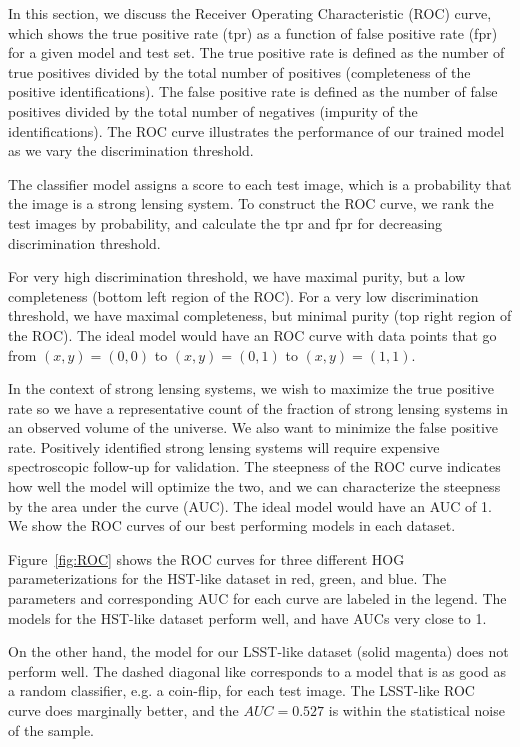 \documentclass{emulateapj}
\begin{document}
In this section, we discuss the Receiver Operating Characteristic
(ROC) curve, which shows the true positive rate (tpr) as a function of
false positive rate (fpr) for a given model and test set.  The true
positive rate is defined as the number of true positives divided by
the total number of positives (completeness of the positive
identifications).  The false positive rate is defined as the number of
false positives divided by the total number of negatives (impurity of
the identifications).  The ROC curve illustrates the performance of
our trained model as we vary the discrimination threshold.

The classifier model assigns a score to each test image, which is a
probability that the image is a strong lensing system.  To construct
the ROC curve, we rank the test images by probability, and calculate
the tpr and fpr for decreasing discrimination threshold.

For very high discrimination threshold, we have maximal purity, but a
low completeness (bottom left region of the ROC).  For a very low
discrimination threshold, we have maximal completeness, but minimal
purity (top right region of the ROC).  The ideal model would have an
ROC curve with data points that go from $(x, y) = (0, 0)$ to $(x, y) =
(0, 1)$ to $(x, y) = (1, 1)$.

In the context of strong lensing systems, we wish to maximize the true
positive rate so we have a representative count of the fraction of
strong lensing systems in an observed volume of the universe.  We also
want to minimize the false positive rate.  Positively identified
strong lensing systems will require expensive spectroscopic follow-up
for validation.  The steepness of the ROC curve indicates how well the
model will optimize the two, and we can characterize the steepness by
the area under the curve (AUC).  The ideal model would have an AUC of
1.  We show the ROC curves of our best performing models in each
dataset.

Figure~\ref{fig:ROC} shows the ROC curves for three different HOG
parameterizations for the HST-like dataset in red, green, and blue.
The parameters and corresponding AUC for each curve are labeled in the
legend.  The models for the HST-like dataset perform well, and have
AUCs very close to 1.  

On the other hand, the model for our LSST-like dataset (solid magenta)
does not perform well.  The dashed diagonal like corresponds to a
model that is as good as a random classifier, e.g. a coin-flip, for
each test image.  The LSST-like ROC curve does marginally better, and
the $AUC=0.527$ is within the statistical noise of the sample.  
\end{document}
